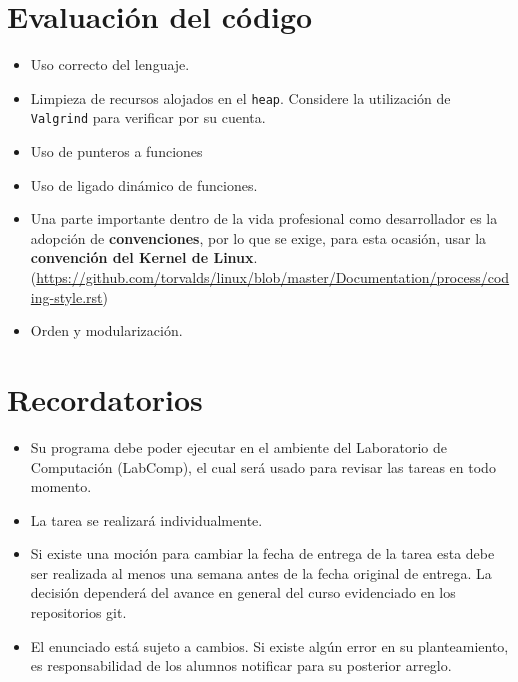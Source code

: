 \documentclass[letterpaper,10pt]{article}
\begin{document}
 \section{Evaluación del código}
 \begin{itemize}
    \item 
        Uso correcto del lenguaje.

    \item
        Limpieza de recursos alojados en el \texttt{heap}. Considere la utilización de \texttt{Valgrind} para verificar por su cuenta.

    \item
        Uso de punteros a funciones

    \item
        Uso de ligado dinámico de funciones.
        
    \item 
        Una parte importante dentro de la vida profesional como desarrollador es la adopción de \textbf{convenciones}, por lo que se exige, para esta ocasión, usar la \textbf{convención del Kernel de Linux}. (\url{https://github.com/torvalds/linux/blob/master/Documentation/process/coding-style.rst})

    \item
        Orden y modularización.
\end{itemize}

 \section{Recordatorios}
 \begin{itemize}
    \item
        Su programa debe poder ejecutar en el ambiente del Laboratorio de Computación (LabComp), el cual será usado para revisar las tareas en todo momento.

    \item
        La tarea se realizará individualmente.
        
    \item
        Si existe una moción para cambiar la fecha de entrega de la tarea esta debe ser realizada al menos una semana antes de la fecha original de entrega. La decisión dependerá del avance en general del curso evidenciado en los repositorios git.
            
    \item
        El enunciado está sujeto a cambios. Si existe algún error en su planteamiento, es responsabilidad de los alumnos notificar para su posterior arreglo.

 \end{itemize}
\end{document}

